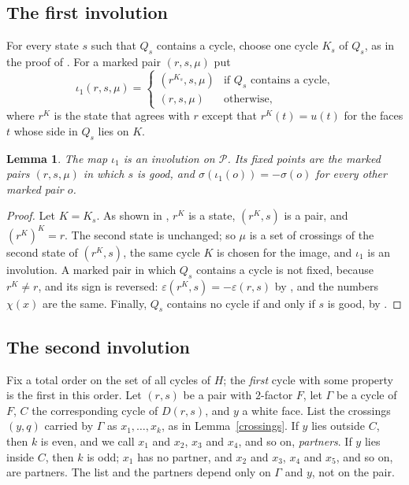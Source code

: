 \documentclass[a4paper]{amsart}
\newtheorem{lemma}[theorem]{Lemma}
\newcommand{\eps}{\varepsilon}
\newcommand{\cP}{\mathcal P}
\begin{document}
\subsection*{The first involution}
For every state $s$ such that $Q_s$ contains a cycle, choose one cycle $K_s$ of $Q_s$, as in the proof of \cite[Lemma~5.6]{P}.
For a marked pair $(r,s,\mu)$ put
\[
\iota_1(r,s,\mu)=\begin{cases}(r^{K_s},s,\mu)&\text{if $Q_s$ contains a cycle,}\\(r,s,\mu)&\text{otherwise,}\end{cases}
\]
where $r^K$ is the state that agrees with $r$ except that $r^K(t)=u(t)$ for the faces $t$ whose side in $Q_s$ lies on $K$.

\begin{lemma}\label{one}
The map $\iota_1$ is an involution on $\cP$.
Its fixed points are the marked pairs $(r,s,\mu)$ in which $s$ is good, and $\sigma(\iota_1(o))=-\sigma(o)$ for every other marked pair $o$.
\end{lemma}

\begin{proof}
Let $K=K_s$.
As shown in \cite[Lemma~5.5(2)]{P}, $r^K$ is a state, $(r^K,s)$ is a pair, and $(r^K)^K=r$.
The second state is unchanged; so $\mu$ is a set of crossings of the second state of $(r^K,s)$, the same cycle $K$ is chosen for the image, and $\iota_1$ is an involution.
A marked pair in which $Q_s$ contains a cycle is not fixed, because $r^K\ne r$, and its sign is reversed: $\eps(r^K,s)=-\eps(r,s)$ by \cite[Lemma~5.5(2)]{P}, and the numbers $\chi(x)$ are the same.
Finally, $Q_s$ contains no cycle if and only if $s$ is good, by \cite[Lemma~5.5(1)]{P}.
\end{proof}

\subsection*{The second involution}
Fix a total order on the set of all cycles of $H$; the \emph{first} cycle with some property is the first in this order.
Let $(r,s)$ be a pair with $2$-factor $F$, let $\Gamma$ be a cycle of $F$, $C$ the corresponding cycle of $D(r,s)$, and $y$ a white face.
List the crossings $(y,q)$ carried by $\Gamma$ as $x_1,\dots,x_k$, as in Lemma~\ref{crossings}.
If $y$ lies outside $C$, then $k$ is even, and we call $x_1$ and $x_2$, $x_3$ and $x_4$, and so on, \emph{partners}.
If $y$ lies inside $C$, then $k$ is odd; $x_1$ has no partner, and $x_2$ and $x_3$, $x_4$ and $x_5$, and so on, are partners.
The list and the partners depend only on $\Gamma$ and $y$, not on the pair.
\end{document}
